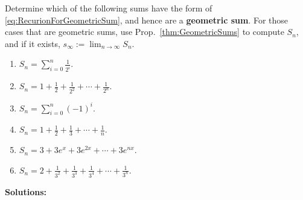 \begin{example} 
\label{ex:GeometrixSums} Determine which of the following sums have the form of \eqref{eq:RecurionForGeometricSum}, and hence are a \textbf{geometric sum}. For those cases that are geometric sums, use Prop.~\ref{thm:GeometricSums} to compute $S_n$, and if it exists, $s_\infty := \displaystyle \lim_{n\to \infty} S_n$.

\begin{enumerate}
\renewcommand{\labelenumi}{(\alph{enumi})}
\setlength{\itemsep}{.2cm}

\item  $S_n = \sum_{i=0}^n \frac{1}{2^i}$.

\item  $S_n = 1 +  \frac{1}{2} + \frac{1}{2^2} + \cdots +\frac{1}{2^n}$.

\item $S_n = \sum_{i=0}^n (-1)^i$.

\item  $S_n =  1 + \frac{1}{2} + \frac{1}{3} + \cdots +  \frac{1}{n}.$

\item  $S_n =  3+ 3e^{x} + 3e^{2x} + \cdots +  3e^{nx}.$

\item $S_n = 2 + \frac{1}{3^2} + \frac{1}{3^3} + \frac{1}{3^4} + \cdots +\frac{1}{3^n}$.
\end{enumerate}
\end{example}

\textbf{Solutions:}


